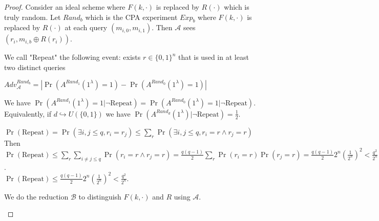 \documentclass{article}
\newcommand{\A}{\mathcal{A}}
\newcommand{\B}{\mathcal{B}}
\newcommand{\half}{\frac{1}{2}}
\newcommand{\bit}{\{0,1\}}
\begin{document}
\begin{proof}
Consider an ideal scheme where $F(k,\cdot)$ is replaced by $R(\cdot)$ which is truly random. Let $Rand_b$ which is the CPA experiment $Exp_b$ where $F(k,\cdot)$ is replaced by $R(\cdot)$ at each query $(m_{i,0},m_{i,1})$. Then $\A$ sees $(r_i,m_{i,b}\oplus R(r_i))$.

We call "Repeat" the following event: exists $r\in\bit^n$ that is used in at least two distinct queries

$Adv^{Rand_b}_\A = |\Pr(A^{Rand_1}(1^\lambda)=1)-\Pr(A^{Rand_0}(1^\lambda)=1)|$

We have $\Pr(A^{Rand_1}(1^\lambda)=1|\neg\text{Repeat})=\Pr(A^{Rand_0}(1^\lambda)=1|\neg\text{Repeat})$. Equivalently, if $d\hookrightarrow U(\bit)$ we have $\Pr(A^{Rand_d}(1^\lambda)|\neg\text{Repeat})=\half$.

$\Pr(\text{Repeat})=\Pr(\exists i,j\leq q, r_i=r_j)\leq\sum_r\Pr(\exists i,j\leq q, r_i=r\wedge r_j=r)$\\
Then $\Pr(\text{Repeat})\leq \sum_r\sum_{i\neq j\leq q}\Pr(r_i=r\wedge r_j=r)=\frac{q(q-1)}{2}\sum_r \Pr(r_i=r)\Pr(r_j=r)=\frac{q(q-1)}{2}2^n(\frac{1}{2^n})^2<\frac{q^2}{2^n}$.\\
$\Pr(\text{Repeat})\leq\frac{q(q-1)}{2}2^n(\frac{1}{2^n})^2<\frac{q^2}{2^n}$.

We do the reduction $\B$ to distinguish $F(k,\cdot)$ and $R$ using $\A$.

\begin{center}
\end{center}
\end{proof}
\end{document}
